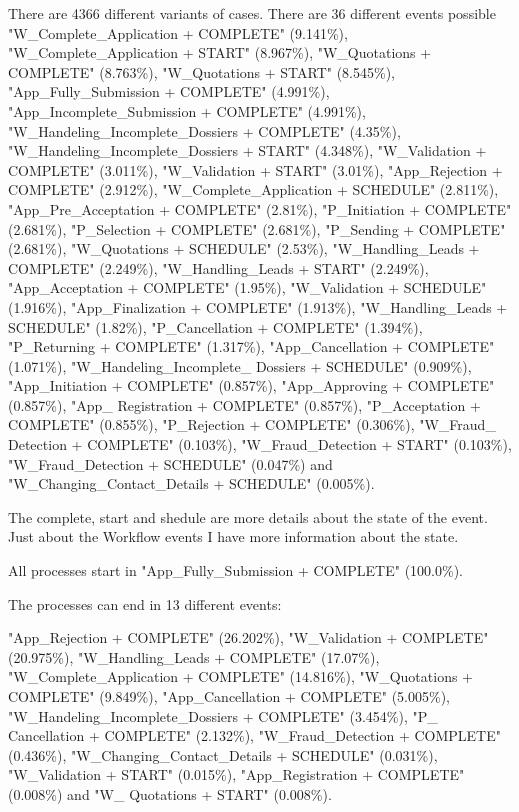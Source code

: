 There are 4366 different variants of cases. There are 36 different events possible 
"W\_Complete\_Application + COMPLETE" (9.141\%), "W\_Complete\_Application + START" (8.967\%), "W\_Quotations + COMPLETE" (8.763\%), "W\_Quotations + START" (8.545\%), "App\_Fully\_Submission + COMPLETE" (4.991\%), "App\_Incomplete\_Submission + COMPLETE" (4.991\%), "W\_Handeling\_Incomplete\_Dossiers + COMPLETE" (4.35\%), "W\_Handeling\_Incomplete\_Dossiers + START" (4.348\%), "W\_Validation + COMPLETE" (3.011\%), "W\_Validation + START" (3.01\%), "App\_Rejection + COMPLETE" (2.912\%), "W\_Complete\_Application + SCHEDULE" (2.811\%), "App\_Pre\_Acceptation + COMPLETE" (2.81\%), "P\_Initiation + COMPLETE" (2.681\%), "P\_Selection + COMPLETE" (2.681\%), "P\_Sending + COMPLETE" (2.681\%), "W\_Quotations + SCHEDULE" (2.53\%), "W\_Handling\_Leads + COMPLETE" (2.249\%), "W\_Handling\_Leads + START" (2.249\%), "App\_Acceptation + COMPLETE" (1.95\%), "W\_Validation + SCHEDULE" (1.916\%), "App\_Finalization + COMPLETE" (1.913\%), "W\_Handling\_Leads + SCHEDULE" (1.82\%), "P\_Cancellation + COMPLETE" (1.394\%), "P\_Returning + COMPLETE" (1.317\%), "App\_Cancellation + COMPLETE" (1.071\%), "W\_Handeling\_Incomplete\_ Dossiers + SCHEDULE" (0.909\%), "App\_Initiation + COMPLETE" (0.857\%), "App\_Approving + COMPLETE" (0.857\%), "App\_ Registration + COMPLETE" (0.857\%), "P\_Acceptation + COMPLETE" (0.855\%), "P\_Rejection + COMPLETE" (0.306\%), "W\_Fraud\_ Detection + COMPLETE" (0.103\%), "W\_Fraud\_Detection + START" (0.103\%), "W\_Fraud\_Detection + SCHEDULE" (0.047\%) and "W\_Changing\_Contact\_Details + SCHEDULE" (0.005\%).

The complete, start and shedule are more details about the state of the event. Just about the Workflow events I have more information about the state. 

All processes start in "App\_Fully\_Submission + COMPLETE" (100.0\%).

The processes can end in 13 different events:

"App\_Rejection + COMPLETE" (26.202\%), "W\_Validation + COMPLETE" (20.975\%), "W\_Handling\_Leads + COMPLETE" (17.07\%), "W\_Complete\_Application + COMPLETE" (14.816\%), "W\_Quotations + COMPLETE" (9.849\%), "App\_Cancellation + COMPLETE" (5.005\%), "W\_Handeling\_Incomplete\_Dossiers + COMPLETE" (3.454\%), "P\_ Cancellation + COMPLETE" (2.132\%), "W\_Fraud\_Detection + COMPLETE" (0.436\%), "W\_Changing\_Contact\_Details + SCHEDULE" (0.031\%), "W\_Validation + START" (0.015\%), "App\_Registration + COMPLETE" (0.008\%) and "W\_ Quotations + START" (0.008\%).

